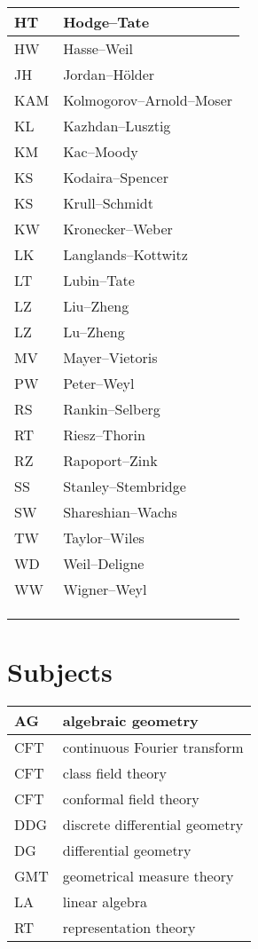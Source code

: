 \documentclass{amsart}
\numberwithin{equation}{section}
\theoremstyle{plain}
\numberwithin{equation}{section}
\theoremstyle{remark}
\begin{document}
\begin{longtable}{l|l}
HT & Hodge--Tate\\ \hline
HW & Hasse--Weil\\ \hline
JH & Jordan--Hölder\\ \hline
KAM & Kolmogorov--Arnold--Moser\\ \hline
KL & Kazhdan--Lusztig \\ \hline
KM  & Kac--Moody\\ \hline
KS & Kodaira--Spencer\\ \hline
KS & Krull--Schmidt\\ \hline
KW  & Kronecker--Weber\\ \hline
LK & Langlands--Kottwitz\\ \hline
LT  & Lubin--Tate\\ \hline
LZ & Liu--Zheng\\ \hline
LZ & Lu--Zheng\\ \hline
MV & Mayer--Vietoris\\ \hline
PW  & Peter--Weyl\\ \hline
RS & Rankin--Selberg\\ \hline
RT & Riesz--Thorin\\ \hline
RZ & Rapoport--Zink\\ \hline
SS & Stanley--Stembridge\\ \hline
SW & Shareshian--Wachs\\ \hline
TW & Taylor--Wiles\\ \hline
WD & Weil--Deligne\\ \hline
WW & Wigner--Weyl\\ \hline
  & \\ \hline
  & \\ \hline
  & \\ \hline
\end{longtable}

\section{Subjects}

\begin{longtable}{l|l}
\hline
AG & algebraic geometry \\ \hline
CFT  & continuous Fourier transform\\ \hline
CFT & class field theory\\ \hline
CFT & conformal field theory\\ \hline
DDG & discrete differential geometry\\ \hline
DG & differential geometry\\ \hline
GMT  & geometrical measure theory\\ \hline
LA & linear algebra  \\ \hline
RT & representation theory\\ \hline
\end{longtable}
\end{document}
